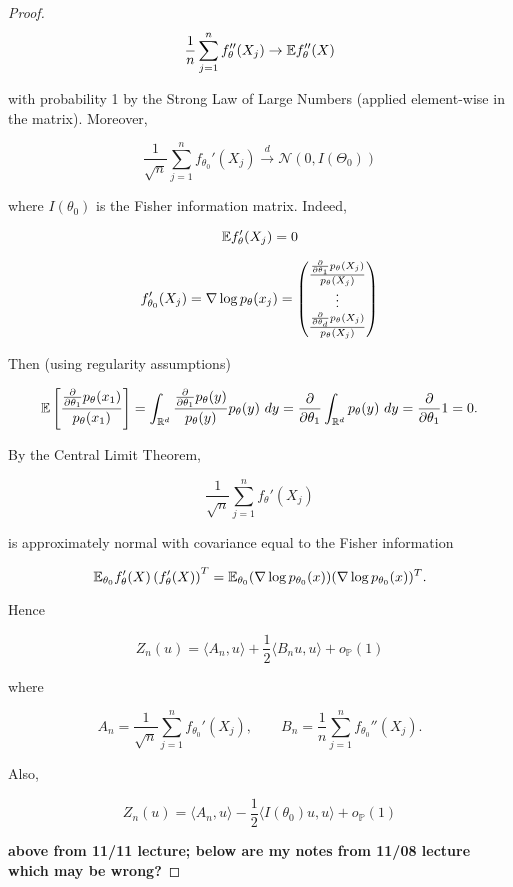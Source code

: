 \begin{proof}
\[
\frac{1}{n} \sum_{j=1}^n f_{\theta} ''(X_j) \to \E f_{\theta}'' (X)
\]

with probability 1 by the Strong Law of Large Numbers (applied element-wise in the matrix). Moreover,

\begin{equation}\label{mathstats.547.wilks.dist.1}
\frac{1}{\sqrt{n}} \sum_{j=1}^n f_{\theta_0}'(X_j) \xrightarrow{d} \mathcal{N}(0, I(\Theta_0))
\end{equation}

where \(I(\theta_0)\) is the Fisher information matrix. Indeed,

\[
\E f_\theta '(X_j) = 0
\]

\[
f_{\theta_0}'(X_j) = \nabla \log p_\theta(x_j) = \begin{pmatrix} \frac{\pderiv{}{\theta_1} p_\theta(X_j)}{p_\theta(X_j)} \\
\vdots \\
 \frac{\pderiv{}{\theta_d} p_\theta(X_j)}{p_\theta(X_j)} 
\end{pmatrix}
\]

Then (using regularity assumptions)

\[
\E \left[ \frac{ \pderiv{}{\theta_1} p_\theta(x_1)}{p_\theta(x_1)} \right] = \int_{\mathbb{R}^d}  \frac{ \pderiv{}{\theta_1} p_\theta(y)}{p_\theta(y)} p_\theta(y) \ dy = \pderiv{}{\theta_1} \int_{\mathbb{R}^d}   p_\theta(y) \ dy= \pderiv{}{\theta_1} 1 = 0.
\] 

By the Central Limit Theorem,

\[
\frac{1}{\sqrt{n}} \sum_{j=1}^n f_\theta'(X_j)
\]

is approximately normal with covariance equal to the Fisher information

\[
\E_{\theta_0} f_\theta'(X) \left( f_\theta'(X) \right)^T = \E_{\theta_0} ( \nabla \log p_{\theta_0}(x)) ( \nabla \log p_{\theta_0}(x)) ^T.
\]

Hence

\[
Z_n(u) = \langle A_n, u \rangle + \frac{1}{2} \langle B_nu, u \rangle + o_{\mathbb{P}}(1)
\]

where

\[
A_n = \frac{1}{\sqrt{n}} \sum_{j=1}^n f_{\theta_0}'(X_j), \qquad B_n = \frac{1}{n} \sum_{j=1}^n f_{\theta_0}''(X_j).
\]

Also,

\[
Z_n(u) = \langle A_n, u \rangle - \frac{1}{2} \langle I(\theta_0)u, u \rangle + o_{\mathbb{P}}(1)
\]


\textbf{above from 11/11 lecture; below are my notes from 11/08 lecture which may be wrong?} 


\end{proof}
